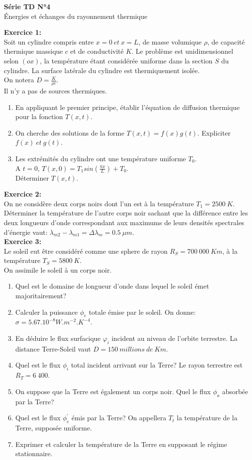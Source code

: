 \documentclass{article}
\begin{document}
\begin{center}
\textbf{Série TD N°4}\\
Énergies et échanges du rayonnement thermique
\end{center}
\textbf{Exercice 1:}\\
Soit un cylindre compris entre $x=0~et~x=L$, de masse volumique $\rho$, de capacité thermique massique $c$ et de conductivité $K$. Le problème est unidimensionnel selon $(ox)$, la température étant considérée uniforme dans la section $S$ du cylindre. La surface latérale du cylindre est thermiquement isolée.\\
On notera $D=\frac{K}{\rho c}$.\\
Il n'y a pas de sources thermiques.
\begin{enumerate}
\item En appliquant le premier principe, établir l'équation de diffusion thermique pour la fonction $T(x,t)$.
\item On cherche des solutions de la forme $T(x,t)=f(x)g(t)$. Expliciter $f(x)~et~g(t)$.
\item Les extrémités du cylindre ont une température uniforme $T_{0}$.\\
A $t=0$, $T(x,0)=T_{1}sin(\frac{\pi x}{L})+T_{0}$.\\
Déterminer $T(x,t)$.
\end{enumerate}
\textbf{Exercice 2:}\\
On ne considère deux corps noirs dont l'un est à la température $T_{1}=2500~K$. Déterminer la température de l'autre corps noir sachant que la différence entre les deux longueurs d'onde correspondant aux maximums de leurs densités spectrales d'énergie vaut: $\lambda_{m2}-\lambda_{m1}=\Delta\lambda_{m}=0.5~\mu m$.\vspace{8px}
\\
\textbf{Exercice 3:}\\
Le soleil eut être considéré comme une sphere de rayon $R_{S}=700~000~Km$, à la température $T_{S}=5800~K$.\\
On assimile le soleil à un corps noir.
\begin{enumerate}
\item Quel est le domaine de longueur d'onde dans lequel le soleil émet majoritairement?
\item Calculer la puissance $\phi_{e}$ totale émise par le soleil. On donne: $\sigma=5.67.10^{-8}W.m^{-2}.K^{-4}$.
\item En déduire le flux surfacique $\varphi_{i}$ incident au niveau de l'orbite terrestre. La distance Terre-Soleil vaut $D=150~millions~de~Km$.
\item Quel est le flux $\phi_{i}$ total incident arrivant sur la Terre? Le rayon terrestre est $R_{T}=6~400$.
\item On suppose que la Terre est également un corps noir. Quel le flux $\phi_{a}$ absorbée par la Terre?
\item Quel est le flux $\phi^{'}_{e}$ émis par la Terre? On appellera $T_{t}$ la température de la Terre, supposée uniforme.
\item Exprimer et calculer la température de la Terre en supposant le régime stationnaire.
\end{enumerate}
\end{document}
